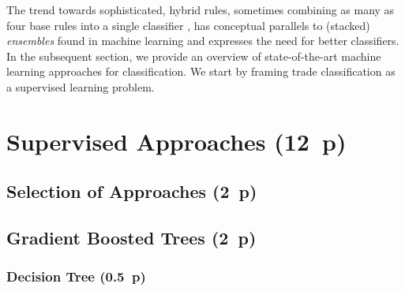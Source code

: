 The trend towards sophisticated, hybrid rules, sometimes combining as many as four base rules into a single classifier \autocite[cp.][18]{grauerOptionTradeClassification2022}, has conceptual parallels to (stacked) \emph{ensembles} found in machine learning and expresses the need for better classifiers. In the subsequent section, we provide an overview of state-of-the-art machine learning approaches for classification. We start by framing trade classification as a supervised learning problem.
\newpage
\section{Supervised Approaches (12~p)}\label{sec:supervised-approaches}

\subsection{Selection of Approaches (2~p)}\label{sec:selection-of-approaches}

\subsection{Gradient Boosted Trees (2~p)}\label{sec:gradient-boosted-trees}

\subsubsection{Decision Tree (0.5~p)}\label{sec:decision-tree}



